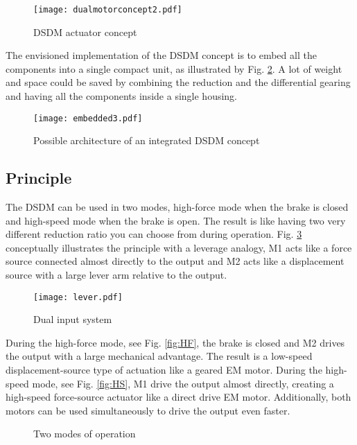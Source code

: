 \begin{figure}[H]
	\centering
		\texttt{[image: dualmotorconcept2.pdf]}
	\caption{DSDM actuator concept}
	\label{fig:dualmotorconcept}
\end{figure}

The envisioned implementation of the DSDM concept is to embed all the components into a single compact unit, as illustrated by Fig. \ref{fig:embedded}. A lot of weight and space could be saved by combining the reduction and the differential gearing and having all the components inside a single housing. 


\begin{figure}[H]
	\centering
		\texttt{[image: embedded3.pdf]}
	\caption{Possible architecture of an integrated DSDM concept}
	\label{fig:embedded}
\end{figure}



\subsection{Principle}
\label{sec:princ}



The DSDM can be used in two modes, high-force mode when the brake is closed and high-speed mode when the brake is open. The result is like having two very different reduction ratio you can choose from during operation. Fig. \ref{fig:lever} conceptually illustrates the principle with a leverage analogy, M1 acts like a force source connected almost directly to the output and M2 acts like a displacement source with a large lever arm relative to the output. 
%
\begin{figure}[H]
	\centering
		\texttt{[image: lever.pdf]}
	\caption{Dual input system}
	\label{fig:lever}
\end{figure}
%
During the high-force mode, see Fig. \ref{fig:HF}, the brake is closed and M2 drives the output with a large mechanical advantage. The result is a low-speed displacement-source type of actuation like a geared EM motor. During the high-speed mode, see Fig. \ref{fig:HS}, M1 drive the output almost directly, creating a high-speed force-source actuator like a direct drive EM motor. Additionally, both motors can be used simultaneously to drive the output even faster.
%
\begin{figure}[H]
        \centering
        \caption{Two modes of operation}\label{fig:opmode}
\end{figure}

